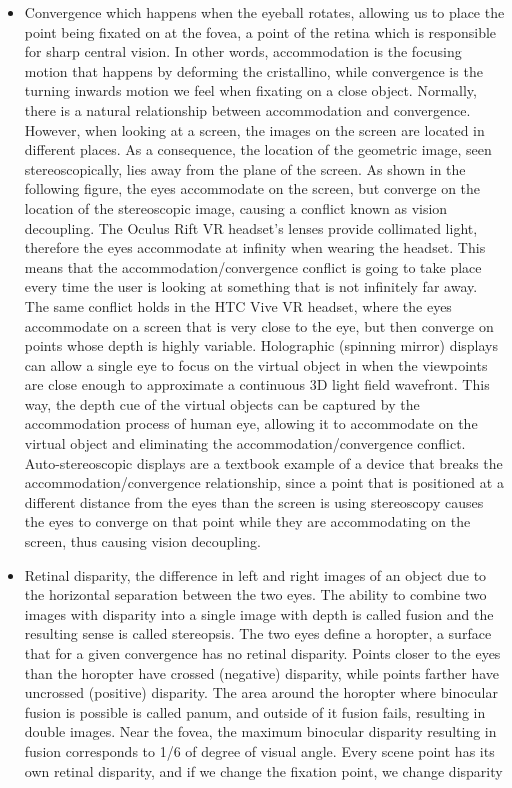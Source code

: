 \documentclass[a4paper]{article}
\begin{document}
\begin{itemize}
\item
  Convergence which happens when the eyeball rotates, allowing us to
  place the point being fixated on at the fovea, a point of the retina
  which is responsible for sharp central vision. In other words,
  accommodation is the focusing motion that happens by deforming the
  cristallino, while convergence is the turning inwards motion we feel
  when fixating on a close object. Normally, there is a natural
  relationship between accommodation and convergence. However, when
  looking at a screen, the images on the screen are located in different
  places. As a consequence, the location of the geometric image, seen
  stereoscopically, lies away from the plane of the screen. As shown in
  the following figure, the eyes accommodate on the screen, but converge
  on the location of the stereoscopic image, causing a conflict known as
  vision decoupling. The Oculus Rift VR headset's lenses provide
  collimated light, therefore the eyes accommodate at infinity when
  wearing the headset. This means that the accommodation/convergence
  conflict is going to take place every time the user is looking at
  something that is not infinitely far away. The same conflict holds in
  the HTC Vive VR headset, where the eyes accommodate on a screen that
  is very close to the eye, but then converge on points whose depth is
  highly variable. Holographic (spinning mirror) displays can allow a
  single eye to focus on the virtual object in when the viewpoints are
  close enough to approximate a continuous 3D light field wavefront.
  This way, the depth cue of the virtual objects can be captured by the
  accommodation process of human eye, allowing it to accommodate on the
  virtual object and eliminating the accommodation/convergence conflict.
  Auto-stereoscopic displays are a textbook example of a device that
  breaks the accommodation/convergence relationship, since a point that
  is positioned at a different distance from the eyes than the screen is
  using stereoscopy causes the eyes to converge on that point while they
  are accommodating on the screen, thus causing vision decoupling.
\item
  Retinal disparity, the difference in left and right images of an
  object due to the horizontal separation between the two eyes. The
  ability to combine two images with disparity into a single image with
  depth is called fusion and the resulting sense is called stereopsis.
  The two eyes define a horopter, a surface that for a given convergence
  has no retinal disparity. Points closer to the eyes than the horopter
  have crossed (negative) disparity, while points farther have uncrossed
  (positive) disparity. The area around the horopter where binocular
  fusion is possible is called panum, and outside of it fusion fails,
  resulting in double images. Near the fovea, the maximum binocular
  disparity resulting in fusion corresponds to 1/6 of degree of visual
  angle. Every scene point has its own retinal disparity, and if we
  change the fixation point, we change disparity
\end{itemize}
\end{document}
